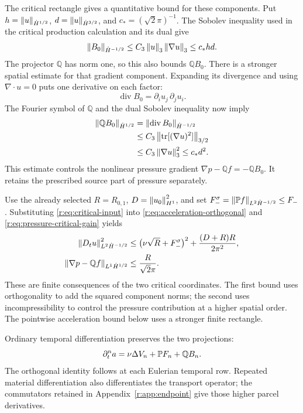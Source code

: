 The critical rectangle gives a quantitative bound for these components.
Put \(h=\left\lVert u\right\rVert_{\dot H^{1/2}}\), \(d=\left\lVert u\right\rVert_{\dot H^{3/2}}\), and
\(c_*=(\sqrt2\pi)^{-1}\). The Sobolev inequality used in
the critical production calculation and its dual give
\[
 \left\lVert B_0\right\rVert_{\dot H^{-1/2}}
 \le C_3\left\lVert u\right\rVert_3\left\lVert \nabla u\right\rVert_3
 \le c_*hd.
\]
The projector \(\mathbb Q\) has norm one, so this also bounds
\(\mathbb Q B_0\). There is a stronger spatial estimate for that
gradient component. Expanding its divergence and using
\(\nabla\cdot u=0\) puts one derivative on each factor:
\[
 \operatorname{div}B_0=\partial_i u_j\,\partial_j u_i.
\]
The Fourier symbol of \(\mathbb Q\) and the dual Sobolev inequality
now imply
\begin{equation}
 \begin{aligned}
 \left\lVert \mathbb Q B_0\right\rVert_{\dot H^{1/2}}
 &=\left\lVert \operatorname{div}B_0\right\rVert_{\dot H^{-1/2}}\\
 &\le C_3\left\lVert \operatorname{tr}[(\nabla u)^2]\right\rVert_{3/2}\\
 &\le C_3\left\lVert \nabla u\right\rVert_3^2
 \le c_*d^2.
 \end{aligned}
 \label{r:eq:pressure-critical-gain}
\end{equation}
This estimate controls the nonlinear pressure gradient
\(\nabla p-\mathbb Q f=-\mathbb Q B_0\). It retains the prescribed
source part of pressure separately.

Use the already selected \(R=R_{0,1}\),
\(D=\left\lVert u_0\right\rVert_{H^1}^2\), and set
\(F_-^\sigma=\left\lVert \mathbb P f\right\rVert_{L^2\dot H^{-1/2}}\le F_-\).
Substituting \eqref{r:eq:critical-input} into
\eqref{r:eq:acceleration-orthogonal} and
\eqref{r:eq:pressure-critical-gain} yields
\begin{equation}
 \begin{aligned}
 \left\lVert D_tu\right\rVert_{L^2\dot H^{-1/2}}^2
 &\le\bigl(\nu\sqrt R+F_-^\sigma\bigr)^2
       +\frac{(D+R)R}{2\pi^2},\\
 \left\lVert \nabla p-\mathbb Q f\right\rVert_{L^1\dot H^{1/2}}
 &\le\frac{R}{\sqrt2\pi}.
 \end{aligned}
 \label{r:eq:critical-material-bounds}
\end{equation}
These are finite consequences of the two critical coordinates.
The first bound uses orthogonality to add the squared component norms;
the second uses incompressibility to control the pressure contribution
at a higher spatial order. The pointwise acceleration bound below uses
a stronger finite rectangle.

Ordinary temporal differentiation preserves the two projections:
\[
 \partial_t^na
 =\nu\Delta V_n+\mathbb P F_n+\mathbb Q B_n.
\]
The orthogonal identity follows at each Eulerian temporal row. Repeated
material differentiation also differentiates the transport operator;
the commutators retained in Appendix~\ref{r:app:endpoint} give those higher
parcel derivatives.


